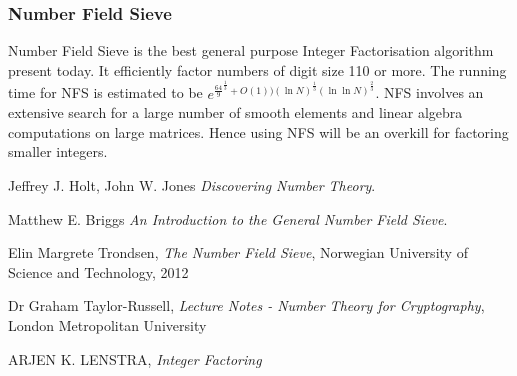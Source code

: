\documentclass[11pt,a4paper,fleqn]{article}
\begin{document}
\begin{enumerate}[1.]
\begin{flushleft}
            \subsubsection*{Number Field Sieve} Number Field Sieve is the best general purpose Integer Factorisation algorithm present today. It efficiently factor numbers of digit size 110 or more. The running time for NFS is estimated \cite{number_theory_3} to be $e^{\frac{64}{9}^{\frac{1}{3}}+O(1))(\ln N)^{\frac{1}{3}}(\ln \ln N)^{\frac{2}{3}}}$. NFS involves an extensive search for a large number of smooth elements and linear algebra computations on large matrices. Hence using NFS will be an overkill for factoring smaller integers.
        \end{flushleft}
	\end{enumerate}

	\begin{thebibliography}{unsrt}

		 Jeffrey J. Holt, John W. Jones \emph{Discovering Number Theory}.

        Matthew E. Briggs \emph{An Introduction to the General Number Field Sieve}.

        Elin Margrete Trondsen, \emph{The Number Field Sieve}, Norwegian University of Science and Technology, 2012

        Dr Graham Taylor-Russell, \emph{Lecture Notes - Number Theory for Cryptography}, London Metropolitan University

        ARJEN K. LENSTRA, \emph{Integer Factoring}
	   \end{thebibliography}
\end{document}
